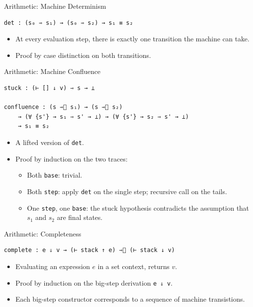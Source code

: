 \documentclass[10pt,compress,aspectratio=169]{beamer}
\begin{document}
\begin{frame}[fragile]{Arithmetic: Machine Determinism}
\begin{verbatim}
det : (s₀ ⇾ s₁) → (s₀ ⇾ s₂) → s₁ ≡ s₂
\end{verbatim}
\begin{itemize}
    \item At every evaluation step, there is exactly one transition the machine can take.
    \item Proof by case distinction on both transitions.
\end{itemize}
\end{frame}

\begin{frame}[fragile]{Arithmetic: Machine Confluence}
\begin{verbatim}
stuck : (⊢ [] ↓ v) ⇾ s → ⊥

confluence : (s ⇾⃰ s₁) → (s ⇾⃰ s₂)
    → (∀ {s'} → s₁ ⇾ s' → ⊥) → (∀ {s'} → s₂ ⇾ s' → ⊥)
    → s₁ ≡ s₂
\end{verbatim}
\begin{itemize}
    \item A lifted version of \texttt{det}.
    \item Proof by induction on the two traces:
    \begin{itemize}
        \item Both \texttt{base}: trivial.
        \item Both \texttt{step}: apply \texttt{det} on the single step; recursive call on the tails.
        \item One \texttt{step}, one \texttt{base}: the stuck hypothesis contradicts the assumption that $s_1$ and $s_2$ are final states.
    \end{itemize}
\end{itemize}
\end{frame}

\begin{frame}[fragile]{Arithmetic: Completeness}
\begin{verbatim}
complete : e ⇓ v → (⊢ stack ↑ e) ⇾⃰ (⊢ stack ↓ v)
\end{verbatim}
\begin{itemize}
    \item Evaluating an expression $e$ in a set context, returns $v$. 
    \item Proof by induction on the big-step derivation \texttt{e ⇓ v}.
    \item Each big-step constructor corresponds to a sequence of machine transistions.
\end{itemize}
\end{frame}
\end{document}
